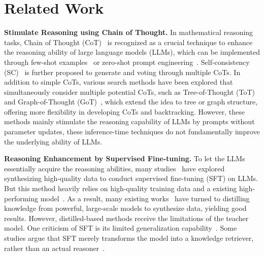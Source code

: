 
\section{Related Work}

\noindent\textbf{Stimulate Reasoning using Chain of Thought.}
In mathematical reasoning tasks, Chain of Thought (CoT)~\cite{wei2022chain} is recognized as a crucial technique to enhance the reasoning ability of large language models (LLMs), which can be implemented through few-shot examples~\cite{wei2022chain} or zero-shot prompt engineering~\cite{kojima2022large}. 
Self-consistency (SC)~\cite{wang2022self} is further proposed to generate and voting through multiple CoTs. 
In addition to simple CoTs, various search methods have been explored that simultaneously consider multiple potential CoTs, such as Tree-of-Thought (ToT)~\cite{yao2024tree} and Graph-of-Thought (GoT)~\cite{besta2024graph}, which extend the idea to tree or graph structure, offering more flexibility in developing CoTs and backtracking.
However, these methods mainly stimulate the reasoning capability of LLMs by prompts without parameter updates, these inference-time techniques do not fundamentally improve the underlying ability of LLMs.

\noindent\textbf{Reasoning Enhancement by Supervised Fine-tuning.}
To let the LLMs essentially acquire the reasoning abilities, many studies~\cite {ying2024internlm, yu2023metamath, liu2024augmenting, li2023query, liu2023goat, yue2023mammoth} have explored synthesizing high-quality data to conduct supervised fine-tuning (SFT) on LLMs. 
But this method heavily relies on high-quality training data and a existing high-performing model~\cite{lightman2023let}. 
As a result, many existing works~\cite{huang2024o1, Slow_Thinking_with_LLMs_2} have turned to distilling knowledge from powerful, large-scale models to synthesize data, yielding good results. 
However, distilled-based methods receive the limitations of the teacher model.
One criticism of SFT is its limited generalization capability~\cite{chu2025sft}. 
Some studies argue that SFT merely transforms the model into a knowledge retriever, rather than an actual reasoner~\cite{kambhampati2024can}.



